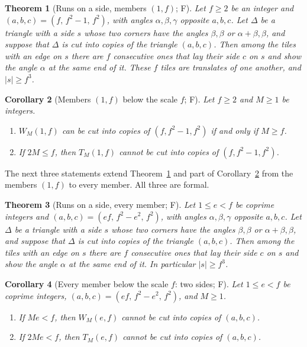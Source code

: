 \documentclass[11pt,reqno]{amsart}
\theoremstyle{plain}
\newtheorem{theorem}{Theorem}[section]
\newtheorem{corollary}[theorem]{Corollary}
\theoremstyle{definition}
\newcommand{\sF}{\textup{\textsf{F}}}
\begin{document}
\begin{theorem}[Runs on a side, members $(1,f)$; \sF]\label{thm:siderun}
Let $f\ge2$ be an integer and $(a,b,c)=(f,\,f^2-1,\,f^2)$, with angles $\alpha,\beta,\gamma$ opposite
$a,b,c$. Let $\Delta$ be a triangle with a side $s$ whose two corners have the angles $\beta,\beta$ or
$\alpha+\beta,\beta$, and suppose that $\Delta$ is cut into copies of the triangle $(a,b,c)$. Then among the
tiles with an edge on $s$ there are $f$ consecutive ones that lay their side $c$ on $s$ and show the angle
$\alpha$ at the same end of it. These $f$ tiles are translates of one another, and $|s|\ge f^3$.
\end{theorem}

\begin{corollary}[Members $(1,f)$ below the scale $f$; \sF]\label{cor:below}
Let $f\ge2$ and $M\ge1$ be integers.
\begin{enumerate}
\item[\textup{(a)}] $W_M(1,f)$ can be cut into copies of $(f,f^2-1,f^2)$ if and only if $M\ge f$.
\item[\textup{(b)}] If $2M\le f$, then $T_M(1,f)$ cannot be cut into copies of $(f,f^2-1,f^2)$.
\end{enumerate}
\end{corollary}

The next three statements extend Theorem~\ref{thm:siderun} and part of Corollary~\ref{cor:below} from the
members $(1,f)$ to every member. All three are formal.

\begin{theorem}[Runs on a side, every member; \sF]\label{thm:siderunall}
Let $1\le e<f$ be coprime integers and $(a,b,c)=(ef,\,f^2-e^2,\,f^2)$, with angles $\alpha,\beta,\gamma$
opposite $a,b,c$. Let $\Delta$ be a triangle with a side $s$ whose two corners have the angles $\beta,\beta$
or $\alpha+\beta,\beta$, and suppose that $\Delta$ is cut into copies of the triangle $(a,b,c)$. Then among
the tiles with an edge on $s$ there are $f$ consecutive ones that lay their side $c$ on $s$ and show the
angle $\alpha$ at the same end of it. In particular $|s|\ge f^3$.
\end{theorem}

\begin{corollary}[Every member below the scale $f$: two sides; \sF]\label{cor:ebelow}
Let $1\le e<f$ be coprime integers, $(a,b,c)=(ef,\,f^2-e^2,\,f^2)$, and $M\ge1$.
\begin{enumerate}
\item[\textup{(a)}] If $Me<f$, then $W_M(e,f)$ cannot be cut into copies of $(a,b,c)$.
\item[\textup{(b)}] If $2Me<f$, then $T_M(e,f)$ cannot be cut into copies of $(a,b,c)$.
\end{enumerate}
\end{corollary}
\end{document}
